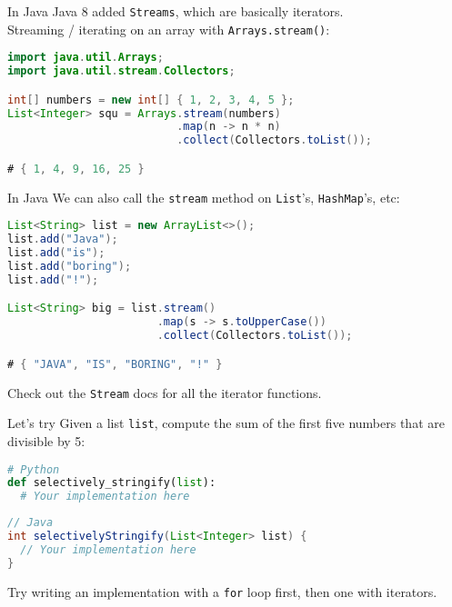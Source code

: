 \documentclass[../index.tex]{subfiles}
\begin{document}
\renewcommand{\currenttitle}{In Java}
\begin{frame}[fragile]{\currenttitle}
  Java 8 added \texttt{Streams}, which are basically iterators. \\[1em]

  Streaming / iterating on an array with \texttt{Arrays.stream()}:

  \begin{lstlisting}[language=Java]
import java.util.Arrays;
import java.util.stream.Collectors;

int[] numbers = new int[] { 1, 2, 3, 4, 5 };
List<Integer> squ = Arrays.stream(numbers)
                          .map(n -> n * n)
                          .collect(Collectors.toList());

# { 1, 4, 9, 16, 25 }
  \end{lstlisting}
\end{frame}

\begin{frame}[fragile]{\currenttitle}
  We can also call the \texttt{stream} method on \texttt{List}'s,
  \texttt{HashMap}'s, etc:

  \begin{lstlisting}[language=Java]
List<String> list = new ArrayList<>();
list.add("Java");
list.add("is");
list.add("boring");
list.add("!");

List<String> big = list.stream()
                       .map(s -> s.toUpperCase())
                       .collect(Collectors.toList());

# { "JAVA", "IS", "BORING", "!" }
  \end{lstlisting}

  Check out the \texttt{Stream} docs for all the iterator functions.
\end{frame}

\renewcommand{\currenttitle}{Let's try}
\begin{frame}[fragile]{\currenttitle}
  Given a list \texttt{list}, compute the sum of the first five numbers that
  are divisible by 5:

  \begin{lstlisting}[language=Python]
# Python
def selectively_stringify(list):
  # Your implementation here
  \end{lstlisting}

  \begin{lstlisting}[language=Java]
// Java
int selectivelyStringify(List<Integer> list) {
  // Your implementation here
}
  \end{lstlisting}

  Try writing an implementation with a \texttt{for} loop first, then one with
  iterators.

\end{frame}
\end{document}
